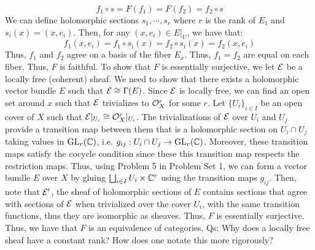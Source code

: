 \documentclass[12pt]{article}
\begin{document}
\begin{solution}
\begin{enumerate}
        \[ f_1 \circ s = F(f_1) = F(f_2) = f_2 \circ s \]
        We can define holomorphic sections $s_1, \cdots, s_r$ where $r$ is the rank of $E_1$ and $s_i(x) = (x, e_i)$. Then, for any $(x, e_i) \in E|_U$, we have that: 
        \[ f_1(x, e_i) = f_1 \circ s_i(x) = f_2 \circ s_i(x) = f_2(x, e_i) \]
        Thus, $f_1$ and $f_2$ agree on a basis of the fiber $E_x$. Thus, $f_1 = f_2$ are equal on each fiber. Thus, $F$ is faithful. \bbni
        To show that $F$ is essentially surjective, we let $\mathcal{E}$ be a locally free (coherent) sheaf. We need to show that there exists a holomorphic vector bundle $E$ such that $\mathcal{E} \cong \Gamma(E)$. Since $\mathcal{E}$ is locally free, we can find an open set around $x$ such that $\mathcal{E}$ trivializes to $\mathcal{O}_X^r$ for some $r$. \bbni
        Let $\{U_i\}_{i \in I}$ be an open cover of $X$ such that $\mathcal{E}|_{U_i} \cong \mathcal{O}_{X}^r|_{U_i}$. The trivializations of $\mathcal{E}$ over $U_i$ and $U_j$ provide a transition map between them that is a holomorphic section on $U_i \cap U_j$ taking values in $\text{GL}_r(\mathbb C)$, i.e. $g_{ij}: U_i \cap U_j \to \text{GL}_r(\mathbb C)$. Moreover, these transition maps satisfy the cocycle condition since these this transition map respects the restriction maps. Thus, using Problem 5 in Problem Set 1, we can form a vector bundle $E$ over $X$ by gluing $\bigsqcup_{i \in I} U_i \times \mathbb C^r$ using the transition maps $g_{ij}$. \bbni
        Then, note that $\mathcal{E}'$, the sheaf of holomorphic sections of $E$ contains sections that agree with sections of $\mathcal{E}$ when trivialized over the cover $U_i$, with the same transition functions, thus they are isomorphic as sheaves. Thus, $F$ is essentially surjective. \bbni
        Thus, we have that $F$ is an equivalence of categories. \bbni
        \bbni Qs: Why does a locally free sheaf have a constant rank? How does one notate this more rigorously?
    \end{enumerate}
\end{solution}
\end{document}
